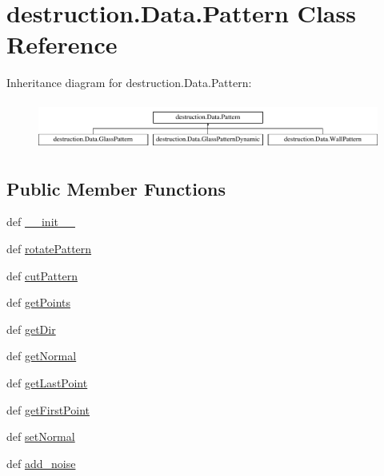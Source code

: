 \hypertarget{classdestruction_1_1_data_1_1_pattern}{\section{destruction.\-Data.\-Pattern Class Reference}
\label{classdestruction_1_1_data_1_1_pattern}
}
Inheritance diagram for destruction.\-Data.\-Pattern\-:\begin{figure}[H]
\begin{center}
\leavevmode
\includegraphics[height=1.581921cm]{classdestruction_1_1_data_1_1_pattern}
\end{center}
\end{figure}
\subsection*{Public Member Functions}
\begin{DoxyCompactItemize}
\item 
def \hyperlink{classdestruction_1_1_data_1_1_pattern_a220899e45611803a859b81f400a0ebc8}{\-\_\-\-\_\-init\-\_\-\-\_\-}
\item 
def \hyperlink{classdestruction_1_1_data_1_1_pattern_aba2039eaaba20b9c3a8188a90d4f7088}{rotate\-Pattern}
\item 
def \hyperlink{classdestruction_1_1_data_1_1_pattern_a88bab05605e35773b5b3b04b70e5b417}{cut\-Pattern}
\item 
def \hyperlink{classdestruction_1_1_data_1_1_pattern_a0e6aa5e1783ae59cfd29f39d5950a893}{get\-Points}
\item 
def \hyperlink{classdestruction_1_1_data_1_1_pattern_a159a27026c8c2fc1d1dcd7a9a7b6a503}{get\-Dir}
\item 
def \hyperlink{classdestruction_1_1_data_1_1_pattern_a12e8f69b151205e8b253052d189a6574}{get\-Normal}
\item 
def \hyperlink{classdestruction_1_1_data_1_1_pattern_a10a1e594c0a86a0f64e97ee721e1513f}{get\-Last\-Point}
\item 
def \hyperlink{classdestruction_1_1_data_1_1_pattern_a3341f07f596374a3ae95f055bc610df2}{get\-First\-Point}
\item 
def \hyperlink{classdestruction_1_1_data_1_1_pattern_abeac79009d5a5129373f2293ed0b5f56}{set\-Normal}
\item 
def \hyperlink{classdestruction_1_1_data_1_1_pattern_a2b575be089105a31cb4aa12c6908c802}{add\-\_\-noise}
\end{DoxyCompactItemize}
